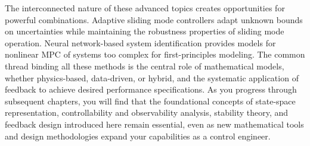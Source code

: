 The interconnected nature of these advanced topics creates opportunities for powerful combinations. Adaptive sliding mode controllers adapt unknown bounds on uncertainties while maintaining the robustness properties of sliding mode operation. Neural network-based system identification provides models for nonlinear MPC of systems too complex for first-principles modeling. The common thread binding all these methods is the central role of mathematical models, whether physics-based, data-driven, or hybrid, and the systematic application of feedback to achieve desired performance specifications. As you progress through subsequent chapters, you will find that the foundational concepts of state-space representation, controllability and observability analysis, stability theory, and feedback design introduced here remain essential, even as new mathematical tools and design methodologies expand your capabilities as a control engineer.

